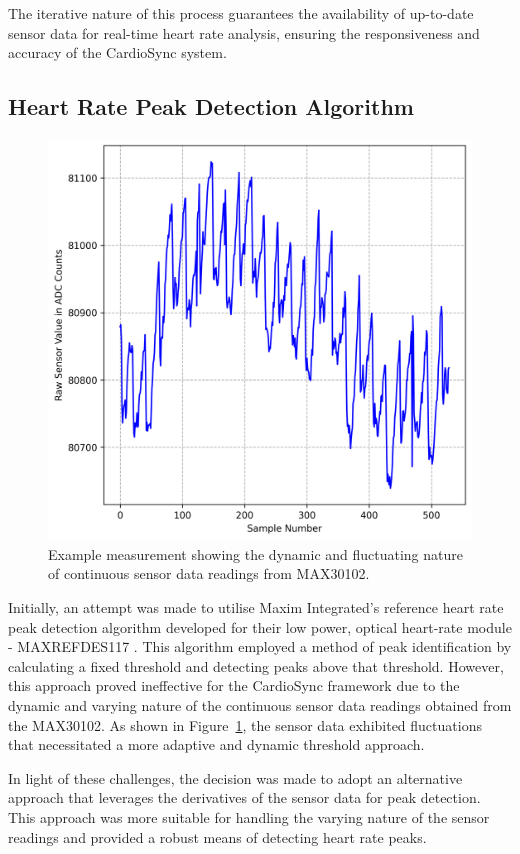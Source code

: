 \noindent The iterative nature of this process guarantees the availability of up-to-date sensor data for real-time heart rate analysis, ensuring the responsiveness and accuracy of the CardioSync system.


\subsection{Heart Rate Peak Detection Algorithm}
\label{sec:heart_rate_algo_impl}

\begin{figure}[t]
    \centering
    \includegraphics[width=0.7\linewidth]{chapters/Implementation/dynamic_threshold.png}
    \caption{Example measurement showing the dynamic and fluctuating nature of continuous sensor data readings from MAX30102.}
    \label{fig:dynamic_threshold}
\end{figure}
\noindent Initially, an attempt was made to utilise Maxim Integrated's reference heart rate peak detection algorithm \cite{SparkFun_MAX3010x_Sensor_Library} developed for their low power, optical heart-rate module - MAXREFDES117 \cite{2016maxrefdes117}. This algorithm employed a method of peak identification by calculating a fixed threshold and detecting peaks above that threshold. However, this approach proved ineffective for the CardioSync framework due to the dynamic and varying nature of the continuous sensor data readings obtained from the MAX30102. As shown in Figure~\ref{fig:dynamic_threshold}, the sensor data exhibited fluctuations that necessitated a more adaptive and dynamic threshold approach.
\vspace{1\baselineskip}

\noindent In light of these challenges, the decision was made to adopt an alternative approach that leverages the derivatives of the sensor data for peak detection. This approach was more suitable for handling the varying nature of the sensor readings and provided a robust means of detecting heart rate peaks.
\vspace{1\baselineskip}


